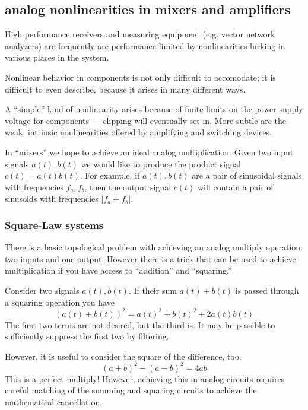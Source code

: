\subsection{analog nonlinearities in mixers and amplifiers}

High performance receivers and measuring equipment (e.g. vector
network analyzers) are frequently are performance-limited by
nonlinearities lurking in various places in the system.

Nonlinear behavior in components is not only difficult to accomodate;
it is difficult to even describe, because it arises in many different
ways.  

A ``simple'' kind of nonlinearity arises because of finite limits on
the power supply voltage for components --- clipping will eventually
set in.  More subtle are the weak, intrinsic nonlinearities offered by
amplifying and switching devices.

In ``mixers'' we hope to achieve an ideal analog multiplication.
Given two input signals $a(t), b(t)$ we would like to produce the
product signal $c(t) = a(t) b(t)$.  For example, if $a(t), b(t)$ are
a pair of sinusoidal signals with frequencies $f_a, f_b$, then the
output signal $c(t)$ will contain a pair of sinusoids with
frequencies $|f_a \pm f_b|$.

\subsubsection{Square-Law systems}

There is a basic topological problem with achieving an analog
multiply operation: two inputs and one output.  However there is a
trick that can be used to achieve multiplication if you have access
to ``addition'' and ``squaring.''

Consider two signals $a(t), b(t)$.  If their sum $a(t) + b(t)$ is
passed through a squaring operation you have
\begin{equation}
(a(t) + b(t))^2 = a(t)^2 + b(t)^2 + 2 a(t) b(t)
\end{equation}
The first two terms are not desired, but the third is.  It may be
possible to sufficiently suppress the first two by filtering. 

However, it is useful to consider the square of the difference, too.
\begin{equation}
(a + b)^2 - (a - b)^2 = 4 ab
\end{equation}
This is a perfect multiply!  However, achieving this in analog
circuits requires careful matching of the summing and squaring
circuits to achieve the mathematical cancellation.

